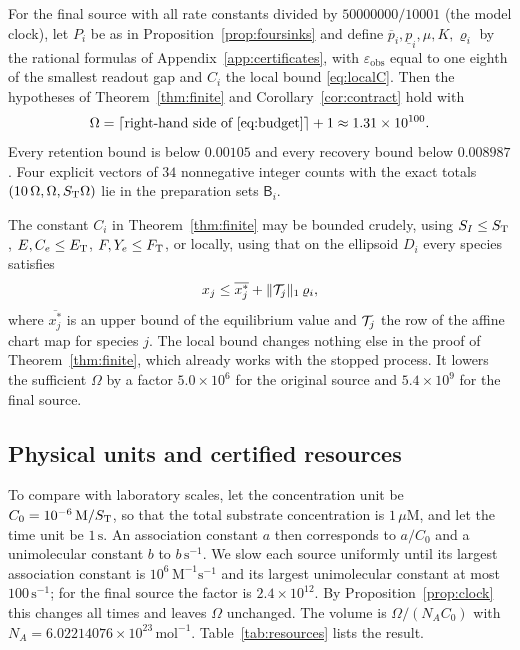 \begin{proposition}\label{prop:contract}
For the final source with all rate constants divided by \(50000000/10001\) \textup{(}the model
clock\textup{)}, let \(P_i\) be as in Proposition~\textup{\ref{prop:foursinks}} and define
\(\overline p_i,\underline p_i,\mu,K,\varrho_i\) by the rational formulas of
Appendix~\textup{\ref{app:certificates}}, with \(\varepsilon_{\mathrm{obs}}\) equal to one
eighth of the smallest readout gap and \(C_i\) the local bound \eqref{eq:localC}. Then the
hypotheses of Theorem~\textup{\ref{thm:finite}} and Corollary~\textup{\ref{cor:contract}} hold
with
\[
 \Omega=\lceil\text{right-hand side of \eqref{eq:budget}}\rceil+1\approx1.31\times10^{100}.
\]
Every retention bound is below \(0.00105\) and every recovery bound below \(0.008987\). Four
explicit vectors of \(34\) nonnegative integer counts with the exact totals
\((10\,\Omega,\Omega,S_{\mathrm T}\Omega)\) lie in the preparation sets \(\mathsf B_i\).
\end{proposition}
The constant \(C_i\) in Theorem~\ref{thm:finite} may be bounded crudely, using
\(S_I\le S_{\mathrm T}\), \(E,C_e\le E_{\mathrm T}\), \(F,Y_e\le F_{\mathrm T}\), or locally, using that on the ellipsoid
\(D_i\) every species satisfies
\begin{equation}\label{eq:localC}
 x_j\le\overline{x_j^*}+\|\mathcal T_j\|_1\,\varrho_i ,
\end{equation}
where \(\overline{x_j^*}\) is an upper bound of the equilibrium value and \(\mathcal T_j\) the row of
the affine chart map for species \(j\). The local bound changes nothing else in the proof of
Theorem~\ref{thm:finite}, which already works with the stopped process. It lowers the
sufficient \(\Omega\) by a factor \(5.0\times10^{6}\) for the original source and
\(5.4\times10^{9}\) for the final source.

\subsection{Physical units and certified resources}
To compare with laboratory scales, let the concentration unit be
\(C_0=10^{-6}\,\mathrm M/S_{\mathrm T}\), so that the total substrate concentration is
\(1\,\mu\mathrm M\), and let the time unit be \(1\,\mathrm s\). An association constant \(a\)
then corresponds to \(a/C_0\) and a unimolecular constant \(b\) to \(b\,\mathrm s^{-1}\). We
slow each source uniformly until its largest association constant is
\(10^{6}\,\mathrm M^{-1}\mathrm s^{-1}\) and its largest unimolecular constant at most
\(100\,\mathrm s^{-1}\); for the final source the factor is \(2.4\times10^{12}\). By
Proposition~\ref{prop:clock} this changes all times and leaves \(\Omega\) unchanged. The
volume is \(\Omega/(N_{\!A}C_0)\) with \(N_{\!A}=6.02214076\times10^{23}\,\mathrm{mol}^{-1}\).
Table~\ref{tab:resources} lists the result.

